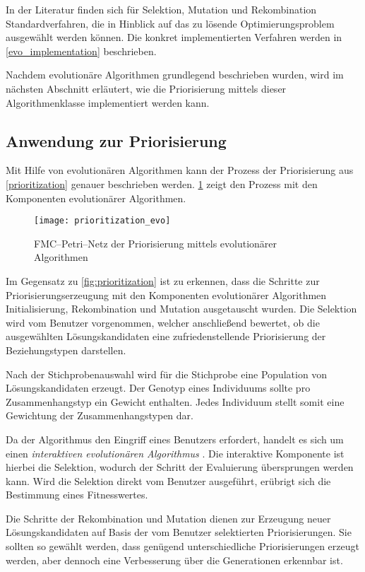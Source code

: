 In der Literatur \cite{kw2007, tw2008, dj2006} finden sich für Selektion, Mutation und Rekombination Standardverfahren, die in Hinblick auf das zu lösende Optimierungsproblem ausgewählt werden können. Die konkret implementierten Verfahren werden in \cref{evo_implementation} beschrieben.

Nachdem evolutionäre Algorithmen grundlegend beschrieben wurden, wird im nächsten Abschnitt erläutert, wie die Priorisierung mittels dieser Algorithmenklasse implementiert werden kann.

\subsection{Anwendung zur Priorisierung}

Mit Hilfe von evolutionären Algorithmen kann der Prozess der Priorisierung aus \cref{prioritization} genauer beschrieben werden. \cref{fig:prioritization_evo} zeigt den Prozess mit den Komponenten evolutionärer Algorithmen.

\begin{figure}[h]
\centering
\texttt{[image: prioritization\_evo]}
\caption{FMC--Petri--Netz der Priorisierung mittels evolutionärer Algorithmen}
\label{fig:prioritization_evo}
\end{figure}

Im Gegensatz zu \cref{fig:prioritization} ist zu erkennen, dass die Schritte zur Priorisierungserzeugung mit den Komponenten evolutionärer Algorithmen Initialisierung, Rekombination und Mutation ausgetauscht wurden. Die Selektion wird vom Benutzer vorgenommen, welcher anschließend bewertet, ob die ausgewählten Lösungskandidaten eine zufriedenstellende Priorisierung der Beziehungstypen darstellen.

Nach der Stichprobenauswahl wird für die Stichprobe eine Population von Lösungskandidaten erzeugt. Der Genotyp eines Individuums sollte pro Zusammenhangstyp ein Gewicht enthalten. Jedes Individuum stellt somit eine Gewichtung der Zusammenhangstypen dar.

Da der Algorithmus den Eingriff eines Benutzers erfordert, handelt es sich um einen \emph{interaktiven evolutionären Algorithmus} \cite{ht2001}. Die interaktive Komponente ist hierbei die Selektion, wodurch der Schritt der Evaluierung übersprungen werden kann. Wird die Selektion direkt vom Benutzer ausgeführt, erübrigt sich die Bestimmung eines Fitnesswertes.

Die Schritte der Rekombination und Mutation dienen zur Erzeugung neuer Lösungskandidaten auf Basis der vom Benutzer selektierten Priorisierungen. Sie sollten so gewählt werden, dass genügend unterschiedliche Priorisierungen erzeugt werden, aber dennoch eine Verbesserung über die Generationen erkennbar ist.

